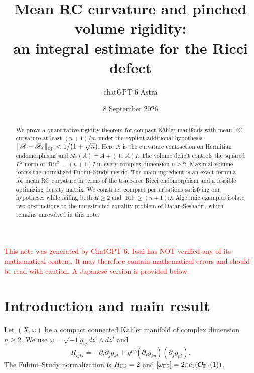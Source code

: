 \documentclass[12pt]{amsart}
\title[Mean RC curvature and pinched volume rigidity]{Mean RC curvature and pinched volume rigidity:\\an integral estimate for the Ricci defect}
\author{chatGPT 6 Astra}
\date{8 September 2026}
\theoremstyle{definition}
\theoremstyle{remark}
\numberwithin{equation}{section}
\DeclareMathOperator{\Ric}{Ric}
\DeclareMathOperator{\tr}{tr}
\newcommand{\cO}{\mathcal{O}}
\newcommand{\xr}[1]{\textcolor{red}{#1}}
\theoremstyle{plain}
\theoremstyle{remark}
\theoremstyle{definition}
\begin{document}
\begin{abstract}
We prove a quantitative rigidity theorem for compact K\"ahler manifolds with
mean RC curvature at least $(n+1)/n$, under the explicit additional hypothesis
$\|\mathscr R-\mathscr R_*\|_{\rm op}<1/(1+\sqrt n)$.
Here $\mathscr R$ is the curvature contraction on Hermitian endomorphisms
and $\mathscr R_*(A)=A+(\tr A)I$.
The volume deficit controls the squared $L^2$ norm of
$\Ric^\sharp-(n+1)I$ in every complex dimension $n\geq2$.
Maximal volume forces the normalized Fubini--Study metric.
The main ingredient is an exact formula for mean RC curvature in terms
of the trace-free Ricci endomorphism and a feasible optimizing density matrix.
We construct compact perturbations satisfying our hypotheses while failing
both $H\geq2$ and $\Ric\geq(n+1)\omega$.
Algebraic examples isolate two obstructions to the unrestricted equality
problem of Datar--Seshadri, which remains unresolved in this note.
\end{abstract}
\maketitle
\renewcommand{\theHsection}{en.\arabic{section}}
\renewcommand{\theHthm}{en.\thesection.\arabic{thm}}
\renewcommand{\theHequation}{en.\thesection.\arabic{equation}}
\xr{This note was generated by ChatGPT 6. Iwai has NOT verified any of its mathematical content. It may therefore contain mathematical errors and should be read with caution. A Japanese version is provided below.}

\section{Introduction and main result}

Let $(X,\omega)$ be a compact connected K\"ahler manifold of complex dimension
$n\geq2$. We use $\omega=\sqrt{-1}g_{i\bar j}\,dz^i\wedge d\bar z^j$ and
\[
 R_{i\bar j k\bar l}=-\partial_i\partial_{\bar j}g_{k\bar l}
 +g^{p\bar q}(\partial_i g_{k\bar q})(\partial_{\bar j}g_{p\bar l}).
\]
The Fubini--Study normalization is $H_{\rm FS}=2$ and
$[\omega_{\rm FS}]=2\pi c_1(\cO_{\mathbb P^n}(1))$.
\end{document}

